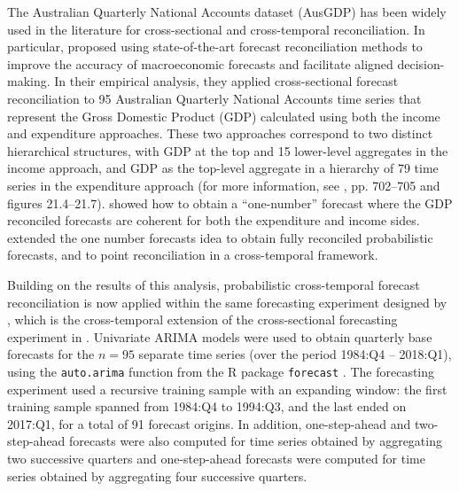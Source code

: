 \documentclass[a4paper,11pt]{article}
\theoremstyle{definition}
\begin{document}
The Australian Quarterly National Accounts dataset (AusGDP) has been widely used in the literature for cross-sectional and cross-temporal reconciliation. In particular, \cite{athanasopoulos2020} proposed using state-of-the-art forecast reconciliation methods to improve the accuracy of macroeconomic forecasts and facilitate aligned decision-making. In their empirical analysis, they applied cross-sectional forecast reconciliation to 95 Australian Quarterly National Accounts time series that represent the Gross Domestic Product (GDP) calculated using both the income and expenditure approaches. These two approaches correspond to two distinct hierarchical structures, with GDP at the top and 15 lower-level aggregates in the income approach, and GDP as the top-level aggregate in a hierarchy of 79 time series in the expenditure approach (for more information, see \citealp{athanasopoulos2020}, pp. 702--705 and figures 21.4--21.7).
\cite{bisaglia2020} showed how to obtain a ``one-number'' forecast where the GDP reconciled forecasts are coherent for both the expenditure and income sides.
\cite{giro2022, difonzo2022c} extended the one number forecasts idea to obtain fully reconciled probabilistic forecasts, and \cite{difonzo2023} to point reconciliation in a cross-temporal framework.

Building on the results of this analysis, probabilistic cross-temporal forecast reconciliation is now applied within the same forecasting experiment designed by \cite{difonzo2023}, which is the cross-temporal extension of the cross-sectional forecasting experiment in \cite{athanasopoulos2020}.
Univariate ARIMA models were used to obtain quarterly base forecasts for the $n = 95$ separate time series (over the period 1984:Q4 -- 2018:Q1), using the \texttt{auto.arima} function from the R package \texttt{forecast} \citep{Rforecast}. The forecasting experiment used a recursive training sample with an expanding window: the first training sample spanned from 1984:Q4 to 1994:Q3, and the last ended on 2017:Q1, for a total of 91 forecast origins. In addition, one-step-ahead and two-step-ahead forecasts were also computed for time series obtained by aggregating two successive quarters and one-step-ahead forecasts were computed for time series obtained by aggregating four successive quarters.

\end{document}
